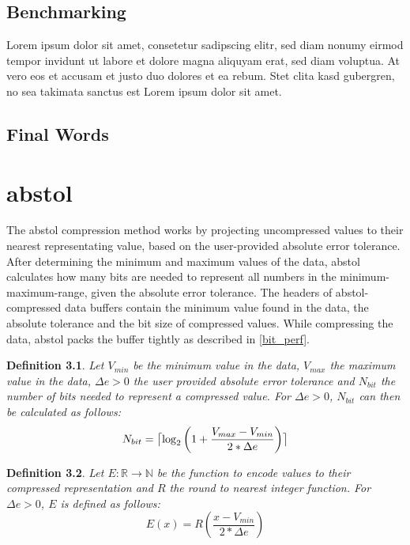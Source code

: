 \documentclass[
	12pt,
	a4paper,
	BCOR10mm,
	DIV14,
	headsepline,
]{scrreprt}
\newtheorem{definition}{Definition}
\DeclarePairedDelimiter{\ceil}{\lceil}{\rceil}
\begin{document}
\section{Benchmarking}
Lorem ipsum dolor sit amet, consetetur sadipscing elitr, sed diam nonumy eirmod tempor invidunt ut labore et dolore magna aliquyam erat, sed diam voluptua.
At vero eos et accusam et justo duo dolores et ea rebum.
Stet clita kasd gubergren, no sea takimata sanctus est Lorem ipsum dolor sit amet.

\section{Final Words}




\appendix
\appendixpage

\chapter{abstol}
\label{abstol}

\bigskip

The abstol compression method works by projecting uncompressed values to their
nearest representating value, based on the user-provided absolute error
tolerance. After determining the minimum and maximum values of the data, abstol
calculates how many bits are needed to represent all numbers in the
minimum-maximum-range, given the absolute error tolerance. The headers of
abstol-compressed data buffers contain the minimum value found in the data, the
absolute tolerance and the bit size of compressed values. While compressing the
data, abstol packs the buffer tightly as described in \cref{bit_perf}.

\bigskip

\begin{definition} \label{D:abstol_nbits}
	Let $V_{min}$ be the minimum value in the data, $V_{max}$ the maximum value
	in the data, $\Delta{e} > 0$ the user provided absolute error tolerance and
	$N_{bit}$ the number of bits needed to represent a compressed value. For
	$\Delta{e}>0$, $N_{bit}$ can then be calculated as follows:
	\[
		N_{bit} =
			\ceil[\big]{
				\log_2{
					\left(
						1 + \frac{V_{max} - V_{min}}{2 * \Delta{e}}
					\right)
				}
			}
	\]
\end{definition}

\bigskip

\begin{definition} \label{D:abstol_enc}
	Let $E:\mathbb{R}\rightarrow\mathbb{N}$ be the function to encode values to
	their compressed representation and $R$ the round to nearest integer
	function. For $\Delta{e}>0$, $E$ is defined as follows:
	\[
		E\left(x\right) =
			R
				\left(
					\frac{x - V_{min}}{2 * \Delta{e}}
				\right)
	\]
\end{definition}
\end{document}
